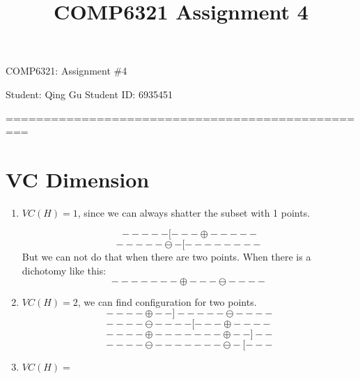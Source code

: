 \documentclass[a4paper, 12pt, titlepage]{article}
\begin{document}
\title{COMP6321 Assignment 4}
\setcounter{tocdepth}{2}
\newpage
\begin{center}
    {\huge COMP6321: Assignment \#4}


    \vspace{2cm}
    Student: Qing Gu  \hspace{5cm}
    Student ID: 6935451
    \vspace{1cm}

    =================================================
\end{center}
\section{VC Dimension}
\begin{enumerate}
    \item $VC(H)=1$, since we can always shatter the subset with 1 points.

        $$-----[---\oplus-----$$
        $$-----\ominus-[--------$$
    But we can not do that when there are two points. When there is a dichotomy like this:
        $$-------\oplus---\ominus----$$

    \item $VC(H)=2$, we can find configuration for two points.
    $$----\oplus--]-----\ominus----$$
    $$----\ominus----[---\oplus----$$
    $$----\oplus-------\oplus--]--$$
    $$----\ominus-------\ominus-[---$$

    \item $VC(H)=$
        
\end{enumerate}
\end{document}
